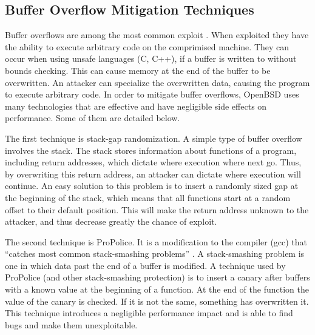 \documentclass[12pt]{article}
\begin{document}
{\subsection*{Buffer Overflow Mitigation Techniques}

Buffer overflows are among the most common exploit \cite{absence}. When exploited they have the ability to execute arbitrary code on the comprimised machine. They can occur when using unsafe languages (C, C++), if a buffer is written to without bounds checking. This can cause memory at the end of the buffer to be overwritten. An attacker can specialize the overwritten data, causing the program to execute arbitrary code. In order to mitigate buffer overflows, OpenBSD uses many technologies \cite{killing-buffer-overflows} that are effective and have negligible side effects on performance. Some of them are detailed below.

The first technique is stack-gap randomization. A simple type of buffer overflow involves the stack. The stack stores information about functions of a program, including return addresses, which dictate where execution where next go. Thus, by overwriting this return address, an attacker can dictate where execution will continue. An easy solution to this problem is to insert a randomly sized gap at the beginning of the stack, which means that all functions start at a random offset to their default position. This will make the return address unknown to the attacker, and thus decrease greatly the chance of exploit. \cite{exploit-mitigation}

The second technique is ProPolice. It is a modification to the compiler (gcc) that ``catches most common stack-smashing problems'' \cite{exploit-mitigation}. A stack-smashing problem is one in which data past the end of a buffer is modified. A technique used by ProPolice (and other stack-smashing protection) is to insert a canary after buffers with a known value at the beginning of a function. At the end of the function the value of the canary is checked. If it is not the same, something has overwritten it. This technique introduces a negligible performance impact and is able to find bugs and make them unexploitable.

}
\end{document}
